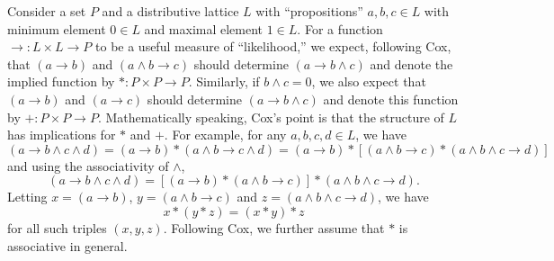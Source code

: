 \documentclass[12pt]{article}
\begin{document}
    Consider a set $P$ and a distributive lattice $L$ with ``propositions''
$a,b,c\in L$ with minimum element $0\in L$ and maximal element $1\in L$.
For a function $\rightarrow:L\times L\rightarrow P$ to be a useful 
measure of ``likelihood,'' 
we expect, following Cox\cite{cox}, that
$(a\rightarrow b)$ and $(a\wedge b\rightarrow c)$ should determine
$(a\rightarrow b\wedge c)$ and denote the implied function by
$*:P\times P\rightarrow P$.  Similarly, if $b\wedge c=0$, we also 
expect that $(a\rightarrow b)$ and $(a\rightarrow c)$ should determine
$(a\rightarrow b\wedge c)$ and denote this function by 
$+:P\times P\rightarrow P$. 
Mathematically speaking, Cox's point is that the structure of $L$
has implications for $*$ and $+$.  For example, for any $a,b,c,d\in L$,
we have 
\begin{equation}
(a\rightarrow b\wedge c\wedge d) = (a\rightarrow b)*(a\wedge b\rightarrow c\wedge d)
= (a\rightarrow b)*[(a\wedge b\rightarrow c)*(a\wedge b\wedge c\rightarrow d)]
\end{equation}
and using the associativity of $\wedge$,
\begin{equation}
(a\rightarrow b\wedge c\wedge d) = [(a\rightarrow b)*(a\wedge b\rightarrow c)]*(a\wedge b\wedge
c\rightarrow d).
\end{equation}
Letting $x=(a\rightarrow b)$, $y=(a\wedge b\rightarrow c)$ and $z=(a\wedge b\wedge c\rightarrow
d)$, we
have
\begin{equation}
x*(y*z) = (x*y)*z
\end{equation}
for all such triples $(x,y,z)$.  Following Cox, we further assume that $*$ is
associative in general.
\end{document}
